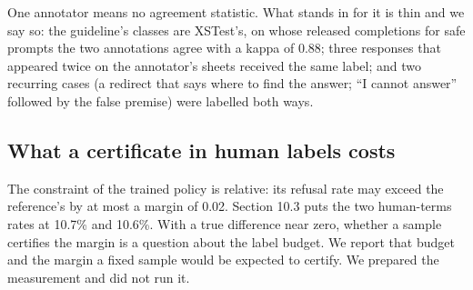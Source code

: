 \documentclass[11pt]{article}
\begin{document}
One annotator means no agreement statistic. What stands in for it is thin and we say so: the guideline's classes are XSTest's, on whose released completions for safe prompts the two annotations agree with a kappa of 0.88; three responses that appeared twice on the annotator's sheets received the same label; and two recurring cases (a redirect that says where to find the answer; ``I cannot answer'' followed by the false premise) were labelled both ways.


\subsection{What a certificate in human labels costs}

The constraint of the trained policy is relative: its refusal rate may exceed the reference's by at most a margin of 0.02. Section 10.3 puts the two human-terms rates at 10.7\% and 10.6\%. With a true difference near zero, whether a sample certifies the margin is a question about the label budget. We report that budget and the margin a fixed sample would be expected to certify. We prepared the measurement and did not run it.
\end{document}
